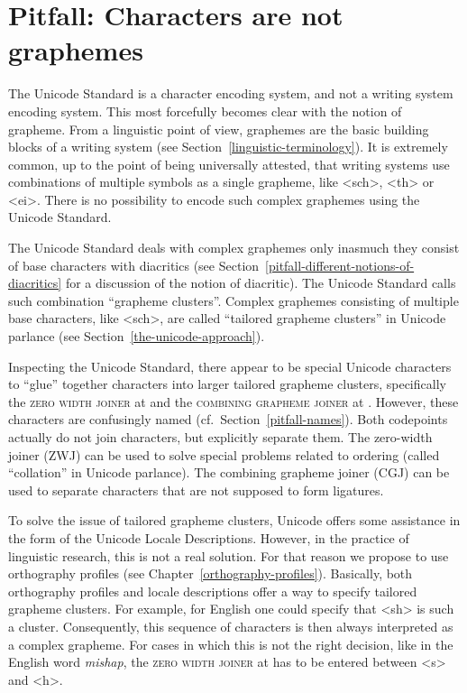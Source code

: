 \section{Pitfall: Characters are not graphemes}
\label{pitfall-characters-are-not-graphemes}

The Unicode Standard is a character encoding system, and not a writing system
encoding system. This most forcefully becomes clear with the notion of grapheme.
From a linguistic point of view, graphemes are the basic building blocks of a
writing system (see Section~\ref{linguistic-terminology}). It is extremely
common, up to the point of being universally attested, that writing systems use
combinations of multiple symbols as a single grapheme, like <sch>, <th> or <ei>.
There is no possibility to encode such complex graphemes using the Unicode Standard.

The Unicode Standard deals with complex graphemes only inasmuch they consist of
base characters with diacritics (see
Section~\ref{pitfall-different-notions-of-diacritics} for a discussion of the
notion of diacritic). The Unicode Standard calls such combination ``grapheme
clusters''. Complex graphemes consisting of multiple base characters,
like <sch>, are called ``tailored grapheme clusters'' in Unicode parlance (see
Section~\ref{the-unicode-approach}).

Inspecting the Unicode Standard, there appear to be special Unicode characters
to ``glue'' together characters into larger tailored grapheme clusters,
specifically the \textsc{zero width joiner} at  and the
\textsc{combining grapheme joiner} at . However, these characters are
confusingly named (cf.~Section~\ref{pitfall-names}). Both codepoints actually do
not join characters, but explicitly separate them. The zero-width joiner (ZWJ)
can be used to solve special problems related to ordering (called ``collation''
in Unicode parlance). The combining grapheme joiner (CGJ) can be used to
separate characters that are not supposed to form ligatures. 

To solve the issue of tailored grapheme clusters, Unicode offers some assistance
in the form of the Unicode Locale Descriptions. However, in the practice of
linguistic research, this is not a real solution. For that reason we propose to
use orthography profiles (see Chapter~\ref{orthography-profiles}). Basically,
both orthography profiles and locale descriptions offer a way to specify
tailored grapheme clusters. For example, for English one could specify that <sh>
is such a cluster. Consequently, this sequence of characters is then always
interpreted as a complex grapheme. For cases in which this is not the right
decision, like in the English word \textit{mishap}, the \textsc{zero width
joiner} at  has to be entered between <s> and <h>.

